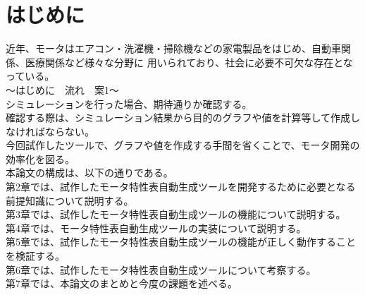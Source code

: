 \chapter{はじめに}\label{cha:Introduction}
近年、モータはエアコン・洗濯機・掃除機などの家電製品をはじめ、自動車関係、医療関係など様々な分野に
用いられており\cite{モータ使用製品}、社会に必要不可欠な存在となっている。\\

～はじめに　流れ　案1～\\
シミュレーションを行った場合、期待通りか確認する。\\
確認する際は、シミュレーション結果から目的のグラフや値を計算等して作成しなければならない。\\
今回試作したツールで、グラフや値を作成する手間を省くことで、モータ開発の効率化を図る。\\



本論文の構成は、以下の通りである。\\
第2章では、試作したモータ特性表自動生成ツールを開発するために必要となる前提知識について説明する。\\
第3章では、試作したモータ特性表自動生成ツールの機能について説明する。\\
第4章では、モータ特性表自動生成ツールの実装について説明する。\\
第5章では、試作したモータ特性表自動生成ツールの機能が正しく動作することを検証する。\\
第6章では、試作したモータ特性表自動生成ツールについて考察する。\\
第7章では、本論文のまとめと今度の課題を述べる。\\
